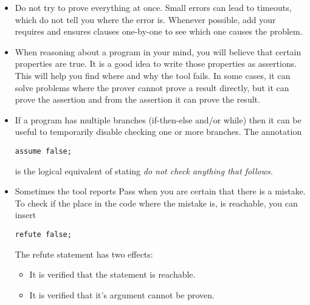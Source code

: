 \begin{itemize}
\item Do not try to prove everything at once. Small errors can lead to timeouts,
which do not tell you where the error is. Whenever possible, add your
requires and ensures clauses one-by-one to see which one causes the problem.
\item When reasoning about a program in your mind, you will believe that
certain properties are true. It is a good idea to write those properties as assertions.
This will help you find where and why the tool fails. In some cases, it can solve
problems where the prover cannot prove a result directly, but it can prove the assertion
and from the assertion it can prove the result.
\item If a program has multiple branches (if-then-else and/or while) then it can be useful
to temporarily disable checking one or more branches. The annotation
\begin{verbatim}
assume false;
\end{verbatim}
is the logical equivalent of stating {\em do not check anything that follows.}
\item Sometimes the tool reports Pass when you are certain that there is a mistake.
To check if the place in the code where the mistake is, is reachable, you can insert
\begin{verbatim}
refute false;
\end{verbatim}
The refute statement has two effects:
\begin{itemize}
\item It is verified that the statement is reachable.
\item It is verified that it's argument cannot be proven.
\end{itemize}
\end{itemize}

